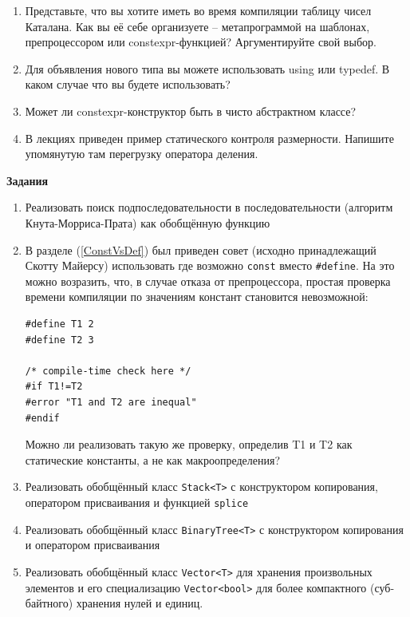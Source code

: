 \documentclass[a4paper,12pt,oneside]{article}
\begin{document}
\begin{enumerate}
\item Представьте, что вы хотите иметь во время компиляции таблицу чисел Каталана. Как вы её себе организуете -- метапрограммой на шаблонах, препроцессором или constexpr-функцией? Аргументируйте свой выбор.
\item Для объявления нового типа вы можете использовать using или typedef. В каком случае что вы будете использовать?
\item Может ли constexpr-конструктор быть в чисто абстрактном классе?
\item В лекциях приведен пример статического контроля размерности. Напишите упомянутую там перегрузку оператора деления.
\end{enumerate}

\textbf{Задания}

\begin{enumerate}

\item
Реализовать поиск подпоследовательности в последовательности (алгоритм Кнута-Морриса-Прата) как обобщённую функцию

\item
В разделе (\ref{ConstVsDef}) был приведен совет (исходно принадлежащий Скотту Майерсу) использовать где возможно \lstinline!const! вместо \lstinline!#define!. На это можно возразить, что, в случае отказа от препроцессора, простая проверка времени компиляции по значениям констант становится невозможной:

\begin{lstlisting}
#define T1 2
#define T2 3

/* compile-time check here */
#if T1!=T2
#error "T1 and T2 are inequal"
#endif
\end{lstlisting}

Можно ли реализовать такую же проверку, определив T1 и T2 как статические константы, а не как макроопределения?

\item
Реализовать обобщённый класс \lstinline!Stack<T>! с конструктором копирования, оператором присваивания и функцией \lstinline!splice!

\item
Реализовать обобщённый класс \lstinline!BinaryTree<T>! с конструктором копирования и оператором присваивания

\item
Реализовать обобщённый класс \lstinline!Vector<T>! для хранения произвольных элементов и его специализацию \lstinline!Vector<bool>! для более компактного (суб-байтного) хранения нулей и единиц.


\end{enumerate}
\end{document}
